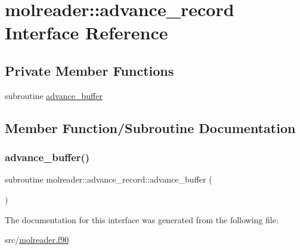\hypertarget{interfacemolreader_1_1advance__record}{}\section{molreader\+:\+:advance\+\_\+record Interface Reference}
\label{interfacemolreader_1_1advance__record}
\subsection*{Private Member Functions}
\begin{DoxyCompactItemize}
\item 
subroutine \hyperlink{interfacemolreader_1_1advance__record_a500888e41a27b357f37c520c1d2a3899}{advance\+\_\+buffer}
\end{DoxyCompactItemize}


\subsection{Member Function/\+Subroutine Documentation}
\mbox{\label{interfacemolreader_1_1advance__record_a500888e41a27b357f37c520c1d2a3899}} 
\subsubsection{\texorpdfstring{advance\+\_\+buffer()}{advance\_buffer()}}
{\footnotesize\ttfamily subroutine molreader\+::advance\+\_\+record\+::advance\+\_\+buffer (\begin{DoxyParamCaption}{ }\end{DoxyParamCaption})\hspace{0.3cm}{\ttfamily [private]}}



The documentation for this interface was generated from the following file\+:\begin{DoxyCompactItemize}
\item 
src/\hyperlink{molreader_8f90}{molreader.\+f90}\end{DoxyCompactItemize}
